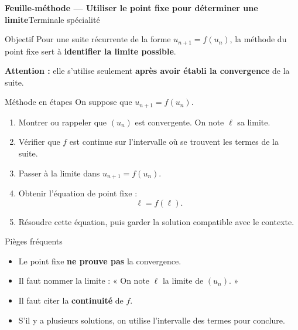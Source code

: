 \documentclass[10pt,a4paper]{article}
\newcommand{\ligne}{\vspace{3.5pt}}
\begin{document}
\thispagestyle{empty}

{\large\bfseries Feuille-méthode --- Utiliser le point fixe pour déterminer une limite}\hfill {\small Terminale spécialité}

\begin{boite}{Objectif}
Pour une suite récurrente de la forme \(u_{n+1}=f(u_n)\), la méthode du point fixe sert à \textbf{identifier la limite possible}.

\textbf{Attention :} elle s'utilise seulement \textbf{après avoir établi la convergence} de la suite.
\end{boite}

\noindent\begin{minipage}[t]{0.48\textwidth}
\begin{boite}{Méthode en étapes}
On suppose que \(u_{n+1}=f(u_n)\).

\ligne
\begin{enumerate}
  \item Montrer ou rappeler que \((u_n)\) est convergente.\newline
        On note \(\ell\) sa limite.

  \item Vérifier que \(f\) est continue sur l'intervalle où se trouvent les termes de la suite.

  \item Passer à la limite dans \(u_{n+1}=f(u_n)\).

  \item Obtenir l'équation de point fixe :
  \[
  \ell=f(\ell).
  \]

  \item Résoudre cette équation, puis garder la solution compatible avec le contexte.
\end{enumerate}
\end{boite}

\begin{boite}{Pièges fréquents}
\begin{itemize}
  \item Le point fixe \textbf{ne prouve pas} la convergence.

  \item Il faut nommer la limite :\newline
  « On note \(\ell\) la limite de \((u_n)\). »

  \item Il faut citer la \textbf{continuité} de \(f\).

  \item S'il y a plusieurs solutions, on utilise l'intervalle des termes pour conclure.
\end{itemize}
\end{boite}
\end{minipage}
\end{document}
